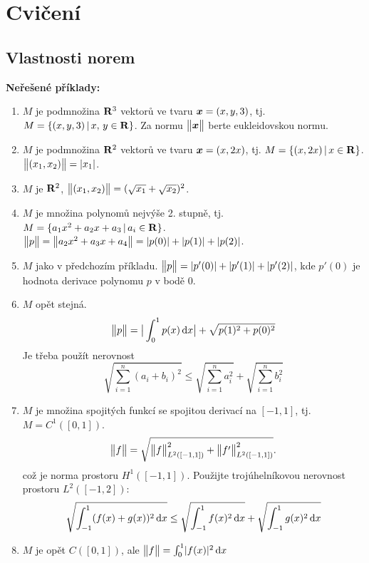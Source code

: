 \section{Cvičení}
\subsection{Vlastnosti norem}
 

 {\bf Neřešené příklady: }
 \begin{enumerate}
        \item $M$ je podmnožina ${\rm\bf R}^3$ vektorů ve tvaru $\mathbf{\boldsymbol{x}}=(x,y,3)$, tj. $M=\{(x,y,3)\,|\, x,\,y\in {\rm\bf R}\}$.
                Za normu $\bigl\Vert\mathbf{\boldsymbol{x}}\bigr\Vert$ berte eukleidovskou normu.
        \item $M$ je podmnožina ${\rm\bf R}^2$ vektorů ve tvaru $\mathbf{\boldsymbol{x}}=(x,2x)$, tj. $M=\{(x,2x)\,|\, x\in {\rm\bf R}\}$.
                 $\bigl\Vert(x_1,x_2)\bigr\Vert=\lvert x_1\rvert$.
        \item $M$ je ${\rm\bf R}^2$, $\bigl\Vert(x_1,x_2)\bigr\Vert=(\sqrt{x_1}+\sqrt{x_2})^2$.
        \item $M$ je množina polynomů nejvýše 2. stupně, tj. $M=\{a_1x^2+a_2x +a_3\,|\, a_i\in{\rm\bf R}\}$.
                $\bigl\Vert p\bigr\Vert=\bigl\Vert a_2x^2+a_3x +a_4\bigr\Vert = \lvert p(0)\rvert+\lvert p(1)\rvert+\lvert p(2)\rvert$.
        \item $M$ jako v předchozím příkladu. $\bigl\Vert p\bigr\Vert=\lvert p'(0)\rvert+\lvert p'(1)\rvert+\lvert p'(2)\rvert$, 
                  kde $p'(0)$ je hodnota derivace polynomu $p$ v bodě $0$.
        \item $M$ opět stejná. 
                \[\bigl\Vert p\bigr\Vert=\big\vert \int_0^1 p(x) \,{\rm d} x \big\vert + \sqrt{p(1)^2+ p(0)^2}\]
                Je třeba použít nerovnost 
                \[ \sqrt{\sum_{i=1}^{n} (a_i+b_i)^2}\le \sqrt{\sum_{i=1}^{n} a_i^2}+\sqrt{\sum_{i=1}^n b_i^2} \]
        \item $M$ je množina spojitých funkcí se spojitou derivací na $[-1,1]$, tj. $M=C^1([0,1])$. 
                \[\bigl\Vert f\bigr\Vert=\sqrt{\bigl\Vert f\bigr\Vert_{L^2([-1,1])}^2+\bigl\Vert f'\bigr\Vert_{L^2([-1,1])}^2}.\]
                což je norma prostoru $H^1([-1,1])$.
                Použijte trojúhelníkovou nerovnost prostoru $L^2([-1,2])$:
                \[ \sqrt{\int_{-1}^{1} (f(x)+g(x))^2\,{\rm d} x}\le 
                        \sqrt{\int_{-1}^{1} f(x)^2\,{\rm d} x} +\sqrt{\int_{-1}^{1} g(x)^2\,{\rm d} x}\]
        \item $M$ je opět $C([0,1])$, ale $\bigl\Vert f\bigr\Vert=\int_{0}^{1} \lvert f(x)\rvert^2 \,{\rm d} x$
\end{enumerate}

